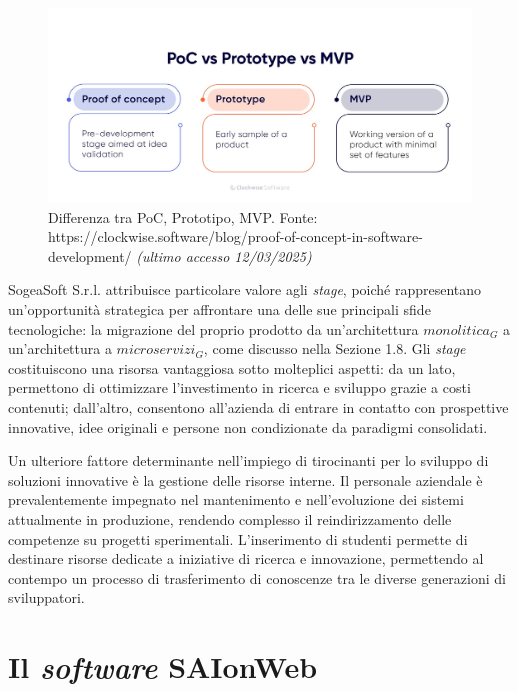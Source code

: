     \begin{figure}[H]
        \centering
        \includegraphics[width=0.6\linewidth]{BCS-Tessi/images/PoC_MVP.jpeg}
        \caption[Differenza tra PoC, Prototipo, MVP]{Differenza tra PoC, Prototipo, MVP. Fonte: https://clockwise.software/blog/proof-of-concept-in-software-development/ \textit{(ultimo accesso 12/03/2025)}}
        \label{fig:PoC-prototipo-MVP}
    \end{figure}

    \vspace{0.2 em}
    \noindent SogeaSoft S.r.l. attribuisce particolare valore agli \textit{stage}, poiché rappresentano un'opportunità strategica per affrontare una delle sue principali sfide tecnologiche: la migrazione del proprio prodotto da un'architettura $monolitica_G$ a un'architettura a $microservizi_G$, come discusso nella Sezione 1.8. Gli \textit{stage} costituiscono una risorsa vantaggiosa sotto molteplici aspetti: da un lato, permettono di ottimizzare l'investimento in ricerca e sviluppo grazie a costi contenuti; dall'altro, consentono all'azienda di entrare in contatto con prospettive innovative, idee originali e persone non condizionate da paradigmi consolidati. 

    \vspace{0.2 em}
    \noindent Un ulteriore fattore determinante nell'impiego di tirocinanti per lo sviluppo di soluzioni innovative è la gestione delle risorse interne. Il personale aziendale è prevalentemente impegnato nel mantenimento e nell'evoluzione dei sistemi attualmente in produzione, rendendo complesso il reindirizzamento delle competenze su progetti sperimentali. L'inserimento di studenti permette di destinare risorse dedicate a iniziative di ricerca e innovazione, permettendo al contempo un processo di trasferimento di conoscenze tra le diverse generazioni di sviluppatori.
    
    \section{Il \textit{software} SAIonWeb}
    
